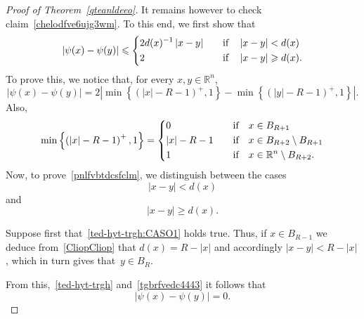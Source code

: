 \documentclass[12pt]{article}
\newcommand{\R}{\mathbb{R}}
\numberwithin{equation}{section}
\renewcommand{\leq}{\leqslant}
\renewcommand{\geq}{\geqslant}
\begin{document}
\begin{proof}[Proof of Theorem~\ref{qteanldeeo}]
It remains however to check claim~\eqref{chelodfve6ujg3wm}.
To this end, we first show that
\begin{equation}\label{pnlfvbtdcsfclm}
\left|\psi(x)-\psi(y)\right|\leq \begin{dcases}
2d(x)^{-1}\left|x-y\right|\quad &\mbox{if}\quad \left|x-y\right|<d(x)\\
2\quad &\mbox{if}\quad \left|x-y\right|\geq d(x).
\end{dcases}
\end{equation}
To prove this, we notice that, for every $x,y\in\R^n$,
\begin{equation}\label{tgbrfvedc4443}
\left|\psi(x)-\psi(y)\right|=2\left|\min\left\lbrace \left(\left|x\right|-R-1\right)^{+}, 1 \right\rbrace-\min\left\lbrace \left(\left|y\right|-R-1\right)^{+}, 1\right\rbrace\right|.
\end{equation}
Also, 
\begin{equation}\label{ted-hyt-trgh}
\min\left\lbrace \left(\left|x\right|-R-1\right)^{+}, 1   \right\rbrace=\begin{dcases}
0\quad &\mbox{if}\quad x\in B_{R+1}\\
\left|x\right|-R-1\quad &\mbox{if}\quad x\in B_{R+2}\setminus B_{R+1}\\
1\quad &\mbox{if}\quad x\in \R^{n}\setminus B_{R+2}. 
\end{dcases}
\end{equation}
Now, to prove~\eqref{pnlfvbtdcsfclm}, we distinguish between the cases \begin{equation}\label{ted-hyt-trgh:CASO1}
\left|x-y\right|<d(x)\end{equation} and \begin{equation}\label{ted-hyt-trgh:CASO2}\left|x-y\right|\geq d(x).\end{equation} 

Suppose first that~\eqref{ted-hyt-trgh:CASO1} holds true.
Thus, if $x\in B_{R-1}$ we deduce from~\eqref{CliopCliop} that $d(x)=R-\left|x\right|$ and accordingly $\left|x-y\right|<R-\left|x\right|$,
which in turn gives that~$y\in B_R$. 

From this,~\eqref{ted-hyt-trgh} and~\eqref{tgbrfvedc4443} it follows that  
\begin{equation}\label{lopwrfv}
\left|\psi(x)-\psi(y)\right|=0. 
\end{equation}


\end{proof}
\end{document}
